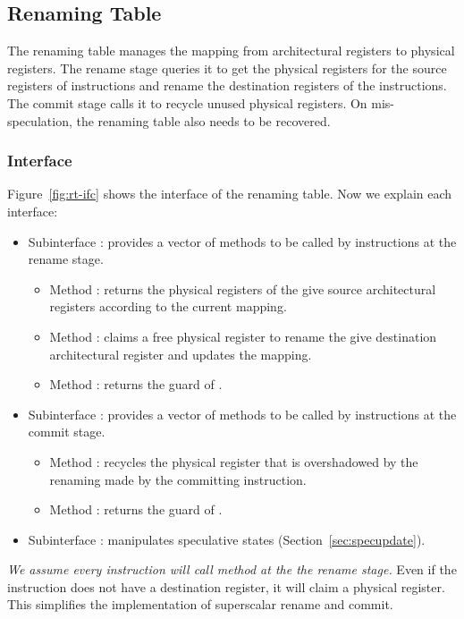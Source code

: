 \subsection{Renaming Table}\label{sec:rt}

The renaming table manages the mapping from architectural registers to physical registers.
The rename stage queries it to get the physical registers for the source registers of instructions and rename the destination registers of the instructions.
The commit stage calls it to recycle unused physical registers.
On mis-speculation, the renaming table also needs to be recovered.

\subsubsection{Interface}

Figure~\ref{fig:rt-ifc} shows the interface of the renaming table.
Now we explain each interface:
\begin{itemize}
    \item Subinterface : provides a vector of methods to be called by instructions at the rename stage.
    \begin{itemize}
        \item Method : returns the physical registers of the give source architectural registers according to the current mapping.
        \item Method : claims a free physical register to rename the give destination architectural register and updates the mapping.
        \item Method : returns the guard of .
    \end{itemize}
    \item Subinterface : provides a vector of methods to be called by instructions at the commit stage.
    \begin{itemize}
        \item Method : recycles the physical register that is overshadowed by the renaming made by the committing instruction.
        \item Method : returns the guard of .
    \end{itemize}
    \item Subinterface : manipulates speculative states (Section~\ref{sec:specupdate}).
\end{itemize}
\emph{We assume every instruction will call method  at the the rename stage.}
Even if the instruction does not have a destination register, it will claim a physical register.
This simplifies the implementation of superscalar rename and commit.

